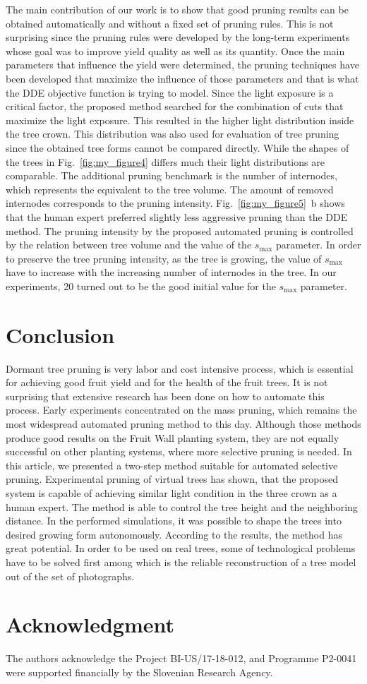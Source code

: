 \documentclass[1p]{elsarticle}
\begin{document}
The main contribution of our work is to show that good pruning results
can be obtained automatically and without a fixed set of pruning rules.
This is not surprising since the pruning rules were developed by the
long-term experiments whose goal was to improve yield quality as well as
its quantity. Once the main parameters that influence the yield were
determined, the pruning techniques have been developed that maximize the
influence of those parameters and that is what the DDE objective
function is trying to model. Since the light exposure is a critical
factor, the proposed method searched for the combination of cuts that
maximize the light exposure. This resulted in the higher light
distribution inside the tree crown. This distribution was also used for
evaluation of tree pruning since the obtained tree forms cannot be
compared directly. While the shapes of the trees in Fig.~\ref{fig:my_figure4} differs much
their light distributions are comparable. The additional pruning
benchmark is the number of internodes, which represents the equivalent
to the tree volume. The amount of removed internodes corresponds to the
pruning intensity. Fig.~\ref{fig:my_figure5}~b shows that the human expert preferred
slightly less aggressive pruning than the DDE method. The pruning
intensity by the proposed automated pruning is controlled by the
relation between tree volume and the value of the \(s_{\mathrm{\max}}\)
parameter. In order to preserve the tree pruning intensity, as the tree
is growing, the value of \(s_{\mathrm{\max}}\) have to increase with the
increasing number of internodes in the tree. In our experiments, 20
turned out to be the good initial value for the \(s_{\mathrm{\max}}\)
parameter.

\section{Conclusion}

Dormant tree pruning is very labor and cost intensive process, which is
essential for achieving good fruit yield and for the health of the fruit
trees. It is not surprising that extensive research has been done on how
to automate this process. Early experiments concentrated on the mass
pruning, which remains the most widespread automated pruning method to
this day. Although those methods produce good results on the Fruit Wall
planting system, they are not equally successful on other planting
systems, where more selective pruning is needed. In this article, we
presented a two-step method suitable for automated selective pruning.
Experimental pruning of virtual trees has shown, that the proposed
system is capable of achieving similar light condition in the three
crown as a human expert. The method is able to control the tree height
and the neighboring distance. In the performed simulations, it was
possible to shape the trees into desired growing form autonomously.
According to the results, the method has great potential. In order to be
used on real trees, some of technological problems have to be solved
first among which is the reliable reconstruction of a tree model out of
the set of photographs.

\section*{Acknowledgment}

The authors acknowledge the Project BI-US/17-18-012, and Programme
P2-0041 were supported financially by the Slovenian Research Agency.


\end{document}

